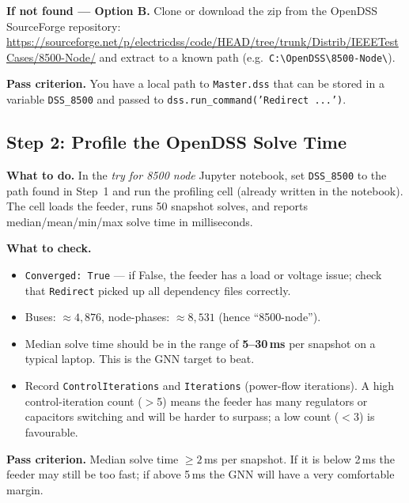 \documentclass[11pt]{article}
\begin{document}
\noindent\textbf{If not found --- Option B.}
Clone or download the zip from the OpenDSS SourceForge repository:
\url{https://sourceforge.net/p/electricdss/code/HEAD/tree/trunk/Distrib/IEEETestCases/8500-Node/}
and extract to a known path (e.g.\ \texttt{C:\textbackslash OpenDSS\textbackslash 8500-Node\textbackslash}).

\noindent\textbf{Pass criterion.}
You have a local path to \texttt{Master.dss} that can be stored in a
variable \texttt{DSS\_8500} and passed to \texttt{dss.run\_command('Redirect ...')}.

\subsection{Step 2: Profile the OpenDSS Solve Time}
\label{subsec:step2}

\noindent\textbf{What to do.}
In the \textit{try for 8500 node} Jupyter notebook, set \texttt{DSS\_8500}
to the path found in Step~1 and run the profiling cell (already written in
the notebook).  The cell loads the feeder, runs 50 snapshot solves, and
reports median/mean/min/max solve time in milliseconds.

\noindent\textbf{What to check.}
\begin{itemize}
  \item \texttt{Converged: True} --- if False, the feeder has a load or
    voltage issue; check that \texttt{Redirect} picked up all dependency
    files correctly.
  \item Buses: ${\approx}4{,}876$, node-phases: ${\approx}8{,}531$ (hence
    ``8500-node'').
  \item Median solve time should be in the range of \textbf{5--30\,ms} per
    snapshot on a typical laptop.  This is the GNN target to beat.
  \item Record \texttt{ControlIterations} and \texttt{Iterations}
    (power-flow iterations).  A high control-iteration count
    ($>$5) means the feeder has many regulators or capacitors switching
    and will be harder to surpass; a low count ($<$3) is favourable.
\end{itemize}

\noindent\textbf{Pass criterion.}
Median solve time $\geq 2$\,ms per snapshot.  If it is below 2\,ms the
feeder may still be too fast; if above 5\,ms the GNN will have a very
comfortable margin.
\end{document}
